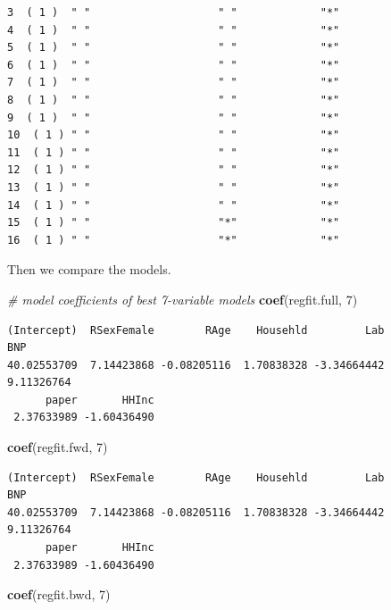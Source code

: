 \documentclass[]{article}
\newenvironment{Shaded}{\begin{snugshade}}{\end{snugshade}}
\newcommand{\CommentTok}[1]{\textcolor[rgb]{0.56,0.35,0.01}{\textit{#1}}}
\newcommand{\DecValTok}[1]{\textcolor[rgb]{0.00,0.00,0.81}{#1}}
\newcommand{\KeywordTok}[1]{\textcolor[rgb]{0.13,0.29,0.53}{\textbf{#1}}}
\newcommand{\NormalTok}[1]{#1}
\begin{document}
\begin{verbatim}
3  ( 1 )  " "                    " "             "*"  
4  ( 1 )  " "                    " "             "*"  
5  ( 1 )  " "                    " "             "*"  
6  ( 1 )  " "                    " "             "*"  
7  ( 1 )  " "                    " "             "*"  
8  ( 1 )  " "                    " "             "*"  
9  ( 1 )  " "                    " "             "*"  
10  ( 1 ) " "                    " "             "*"  
11  ( 1 ) " "                    " "             "*"  
12  ( 1 ) " "                    " "             "*"  
13  ( 1 ) " "                    " "             "*"  
14  ( 1 ) " "                    " "             "*"  
15  ( 1 ) " "                    "*"             "*"  
16  ( 1 ) " "                    "*"             "*"  
\end{verbatim}

Then we compare the models.

\begin{Shaded}
\begin{Highlighting}[]
\CommentTok{# model coefficients of best 7-variable models}
\KeywordTok{coef}\NormalTok{(regfit.full, }\DecValTok{7}\NormalTok{)}
\end{Highlighting}
\end{Shaded}

\begin{verbatim}
(Intercept)  RSexFemale        RAge    Househld         Lab         BNP 
40.02553709  7.14423868 -0.08205116  1.70838328 -3.34664442  9.11326764 
      paper       HHInc 
 2.37633989 -1.60436490 
\end{verbatim}

\begin{Shaded}
\begin{Highlighting}[]
\KeywordTok{coef}\NormalTok{(regfit.fwd, }\DecValTok{7}\NormalTok{)}
\end{Highlighting}
\end{Shaded}

\begin{verbatim}
(Intercept)  RSexFemale        RAge    Househld         Lab         BNP 
40.02553709  7.14423868 -0.08205116  1.70838328 -3.34664442  9.11326764 
      paper       HHInc 
 2.37633989 -1.60436490 
\end{verbatim}

\begin{Shaded}
\begin{Highlighting}[]
\KeywordTok{coef}\NormalTok{(regfit.bwd, }\DecValTok{7}\NormalTok{)}
\end{Highlighting}
\end{Shaded}
\end{document}
